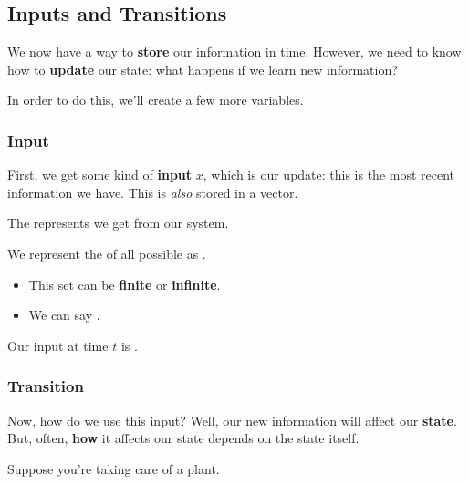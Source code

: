     \subsection{Inputs and Transitions}
    
        We now have a way to \textbf{store} our information in time. However, we need to know how to \textbf{update} our state: what happens if we learn new information? 
        
        In order to do this, we'll create a few more variables. 
        
        \subsubsection{Input}
            First, we get some kind of \textbf{input} $x$, which is our update: this is the most recent information we have. This is \textit{also} stored in a vector.\\
            
            \begin{definition}
                The   represents  we get from our system.
                
                We represent the  of all possible  as .
                    \begin{itemize}
                        \item This set can be \textbf{finite} or \textbf{infinite}.
                        \item We can say .
                    \end{itemize}
                    
                Our input at time $t$ is .
            \end{definition}
            
        \subsecdiv
                
        \subsubsection{Transition}
            
            Now, how do we use this input? Well, our new information will affect our \textbf{state}. But, often, \textbf{how} it affects our state depends on the state itself.
            
            \miniex Suppose you're taking care of a plant.
            
